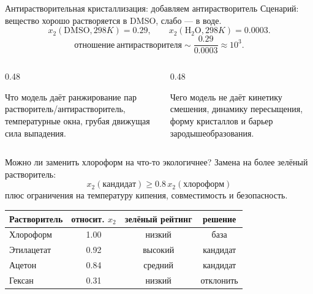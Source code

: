 \documentclass[aspectratio=169,10pt]{beamer}
\begin{document}
\begin{frame}{Антирастворительная кристаллизация: добавляем антирастворитель}
  \small
  Сценарий: вещество хорошо растворяется в DMSO, слабо — в воде.
  \[
    x_2(\mathrm{DMSO},298K)=0.29,\qquad
    x_2(\mathrm{H_2O},298K)=0.0003.
  \]
  \[
    \mathrm{отношение\ антирастворителя}\sim\frac{0.29}{0.0003}\approx10^3.
  \]
  \begin{columns}[T,onlytextwidth]
    \begin{column}{0.48\textwidth}
      \begin{block}{Что модель даёт}
        \scriptsize
        ранжирование пар растворитель/антирастворитель, температурные окна, грубая движущая сила выпадения.
      \end{block}
    \end{column}
    \begin{column}{0.48\textwidth}
      \begin{block}{Чего модель не даёт}
        \scriptsize
        кинетику смешения, динамику пересыщения, форму кристаллов и барьер зародышеобразования.
      \end{block}
    \end{column}
  \end{columns}
\end{frame}

\begin{frame}{Можно ли заменить хлороформ на что-то экологичнее?}
  \small
  Замена на более зелёный растворитель:
  \[
    x_2(\mathrm{кандидат})\ge0.8\,x_2(\mathrm{хлороформ})
  \]
  плюс ограничения на температуру кипения, совместимость и безопасность.
  \vspace{0.4em}
  \begin{center}
  \begin{tabular}{lccc}
    \toprule
    \textbf{Растворитель} & относит. $x_2$ & зелёный рейтинг & решение\\
    \midrule
    Хлороформ & 1.00 & низкий & база\\
    Этилацетат & 0.92 & высокий & кандидат\\
    Ацетон & 0.84 & средний & кандидат\\
    Гексан & 0.31 & низкий & отклонить\\
    \bottomrule
  \end{tabular}
  \end{center}
\end{frame}
\end{document}
